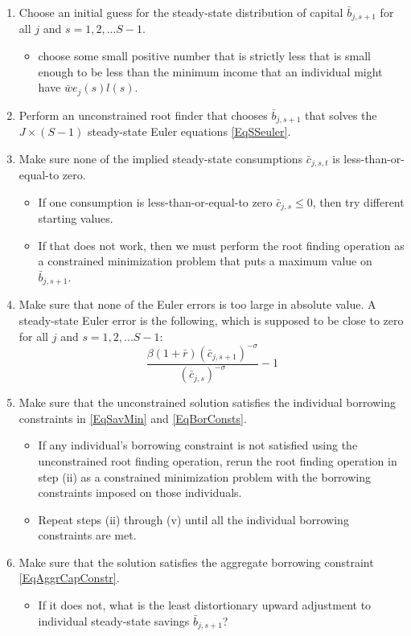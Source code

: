 \documentclass[letterpaper,12pt]{article}
\theoremstyle{definition}
\begin{document}
  \begin{enumerate}
    \item Choose an initial guess for the steady-state distribution of capital $\bar{b}_{j,s+1}$ for all $j$ and $s=1,2,...S-1$.
      \begin{itemize}
        \item choose some small positive number that is strictly less that is small enough to be less than the minimum income that an individual might have $\bar{w}e_j(s)l(s)$.
      \end{itemize}
    \item Perform an unconstrained root finder that chooses $\bar{b}_{j,s+1}$ that solves the $J\times(S-1)$ steady-state Euler equations \eqref{EqSSeuler}.
    \item Make sure none of the implied steady-state consumptions $\bar{c}_{j,s,t}$ is less-than-or-equal-to zero.
      \begin{itemize}
        \item If one consumption is less-than-or-equal-to zero $\bar{c}_{j,s}\leq 0$, then try different starting values.
        \item If that does not work, then we must perform the root finding operation as a constrained minimization problem that puts a maximum value on $\bar{b}_{j,s+1}$.
      \end{itemize}
    \item Make sure that none of the Euler errors is too large in absolute value. A steady-state Euler error is the following, which is supposed to be close to zero for all $j$ and $s=1,2,...S-1$:
      \begin{equation}\label{EqSSeulerr}
        \frac{\beta \left(1+\bar{r}\right)\left(\bar{c}_{j,s+1}\right)^{-\sigma}}{\left(\bar{c}_{j,s}\right)^{-\sigma}} - 1
      \end{equation}
    \item Make sure that the unconstrained solution satisfies the individual borrowing constraints in \eqref{EqSavMin} and \eqref{EqBorConsts}.
      \begin{itemize}
        \item If any individual's borrowing constraint is not satisfied using the unconstrained root finding operation, rerun the root finding operation in step (ii) as a constrained minimization problem with the borrowing constraints imposed on those individuals.
        \item Repeat steps (ii) through (v) until all the individual borrowing constraints are met.
      \end{itemize}
    \item Make sure that the solution satisfies the aggregate borrowing constraint \eqref{EqAggrCapConstr}.
      \begin{itemize}
        \item If it does not, what is the least distortionary upward adjustment to individual steady-state savings $\bar{b}_{j,s+1}$?
      \end{itemize}
  \end{enumerate}
\end{document}
